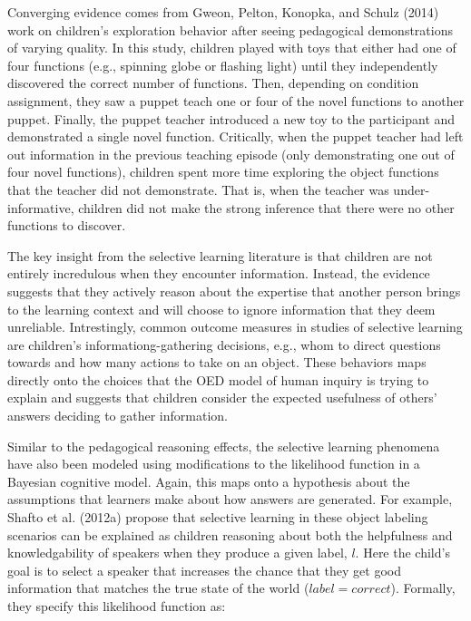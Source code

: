 \documentclass[english,floatsintext,man]{apa6}
\theoremstyle{definition}
\theoremstyle{definition}
\theoremstyle{definition}
\theoremstyle{remark}
\begin{document}
Converging evidence comes from Gweon, Pelton, Konopka, and Schulz (2014)
work on children's exploration behavior after seeing pedagogical
demonstrations of varying quality. In this study, children played with
toys that either had one of four functions (e.g., spinning globe or
flashing light) until they independently discovered the correct number
of functions. Then, depending on condition assignment, they saw a puppet
teach one or four of the novel functions to another puppet. Finally, the
puppet teacher introduced a new toy to the participant and demonstrated
a single novel function. Critically, when the puppet teacher had left
out information in the previous teaching episode (only demonstrating one
out of four novel functions), children spent more time exploring the
object functions that the teacher did not demonstrate. That is, when the
teacher was under-informative, children did not make the strong
inference that there were no other functions to discover.

The key insight from the selective learning literature is that children
are not entirely incredulous when they encounter information. Instead,
the evidence suggests that they actively reason about the expertise that
another person brings to the learning context and will choose to ignore
information that they deem unreliable. Intrestingly, common outcome
measures in studies of selective learning are children's
informationg-gathering decisions, e.g., whom to direct questions towards
and how many actions to take on an object. These behaviors maps directly
onto the choices that the OED model of human inquiry is trying to
explain and suggests that children consider the expected usefulness of
others' answers deciding to gather information.

Similar to the pedagogical reasoning effects, the selective learning
phenomena have also been modeled using modifications to the likelihood
function in a Bayesian cognitive model. Again, this maps onto a
hypothesis about the assumptions that learners make about how answers
are generated. For example, Shafto et al. (2012a) propose that selective
learning in these object labeling scenarios can be explained as children
reasoning about both the helpfulness and knowledgability of speakers
when they produce a given label, \(l\). Here the child's goal is to
select a speaker that increases the chance that they get good
information that matches the true state of the world
(\(label=correct\)). Formally, they specify this likelihood function as:
\end{document}
